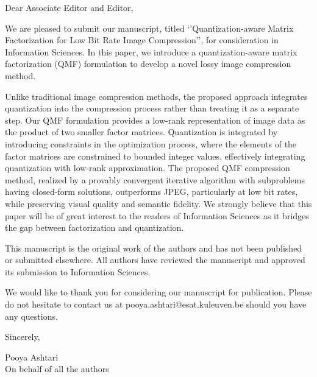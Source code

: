 \documentclass[11pt,letter,numbers]{article}
\begin{document}
\renewcommand{\baselinestretch}{1.0}
\small\normalsize


\renewcommand{\baselinestretch}{1.0}
 \small\normalsize
 \setcounter{page}{1}
 
{
	\footnotesize	
	\noindent
    \hspace*{-0.35cm}
}


\noindent
Dear Associate Editor and Editor,
\bigskip

We are pleased to submit our manuscript, titled `'Quantization-aware Matrix Factorization for Low Bit Rate Image Compression'', for consideration in Information Sciences. In this paper, we introduce a quantization-aware matrix factorization (QMF) formulation to develop a novel lossy image compression method.
\bigskip

Unlike traditional image compression methods, the proposed approach integrates quantization into the compression process rather than treating it as a separate step. Our QMF formulation provides a low-rank representation of image data as the product of two smaller factor matrices. Quantization is integrated by introducing constraints in the optimization process, where the elements of the factor matrices are constrained to bounded integer values, effectively integrating quantization with low-rank approximation. The proposed QMF compression method, realized by a provably convergent iterative algorithm with subproblems having closed-form solutions, outperforms JPEG, particularly at low bit rates, while preserving visual quality and semantic fidelity. We strongly believe that this paper will be of great interest to the readers of Information Sciences as it bridges the gap between factorization and quantization.

\bigskip
This manuscript is the original work of the authors and has not been published or submitted elsewhere. All authors have reviewed the manuscript and approved its submission to Information Sciences.

\bigskip
We would like to thank you for considering our manuscript for publication. Please do not hesitate to contact us at pooya.ashtari@esat.kuleuven.be should you have any questions.

\bigskip
\noindent Sincerely,

\bigskip
\noindent Pooya Ashtari\\
On behalf of all the authors
\end{document}
